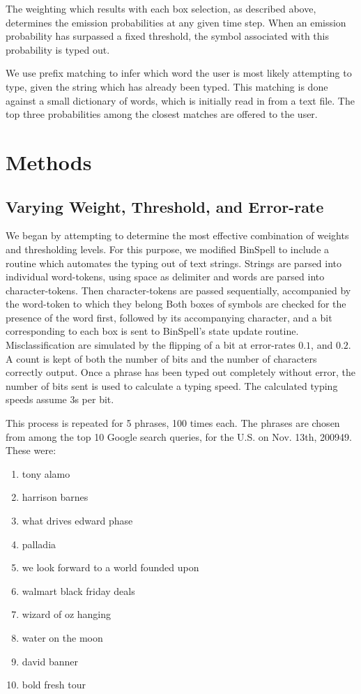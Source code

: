 \documentclass[12pt,titlepage]{article}
\begin{document}
The weighting which results with each box selection, as described above, determines the emission 
probabilities at any given time step.  When an emission probability has surpassed a fixed threshold, the 
symbol associated with this probability is typed out.

We use prefix matching to infer which word the user is most likely attempting to type, given the string 
which has already been typed.  This matching is done against a small dictionary of words, which is 
initially read in from a text file.  The top three probabilities among the closest matches are offered to 
the user.

\section{Methods}

\subsection{Varying Weight, Threshold, and Error-rate}

We began by attempting to determine the most effective combination of weights and 
thresholding levels.  For this purpose, we modified BinSpell to include a routine which 
automates the typing out of text strings.  Strings are parsed  into individual word-tokens, using 
space as delimiter and words are parsed into character-tokens.  Then character-tokens are 
passed sequentially, accompanied by the word-token to which they belong  Both boxes of 
symbols are checked for the presence of the word first, followed by its accompanying 
character, and a bit corresponding to each box is sent to BinSpell's state update routine. 
Misclassification are simulated by the flipping of a bit at error-rates $0.1$, and $0.2$.  A count is 
kept of both the number of bits and the number of characters correctly output.  Once a phrase 
has been typed out completely without error, the number of bits sent is used to calculate a 
typing speed.  The calculated typing speeds assume 3s per bit.

This process is repeated for 5 phrases, 100 times each.  The phrases are chosen from  among 
the top 10 Google search queries, for the  U.S. on Nov. 13th, 200949.  These were: 
\begin{enumerate}
\item tony alamo 
\item harrison barnes 
\item what drives edward phase 
\item palladia 
\item we look forward to a world founded upon 
\item walmart black friday deals 
\item wizard of oz hanging 
\item water on the moon 
\item david banner 
\item bold fresh tour
\end{enumerate}
\end{document}
